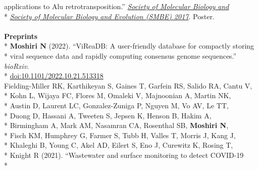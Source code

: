 \documentclass[margin,line]{res}
\begin{document}
\begin{resume}
\hspace*{9mm} applications to Alu retrotransposition.'' \href{https://smbe.org/smbe/}{\textit{Society of Molecular Biology and}}\\*\vspace{2mm}
\hspace*{8mm} \href{https://smbe.org/smbe/}{\textit{Society of Molecular Biology and Evolution (SMBE) 2017}}. Poster.\\
~\\
\textbf{Preprints}\vspace{2mm}\\*
\hspace*{4mm} \textbf{Moshiri N} (2022). ``ViReaDB: A user-friendly database for compactly storing\\*
\hspace*{9mm} viral sequence data and rapidly computing consensus genome sequences.'' \textit{bioRxiv}.\\*\vspace{2mm}
\hspace*{8mm} \href{https://doi.org/10.1101/2022.10.21.513318}{doi:10.1101/2022.10.21.513318}\\
\hspace*{4mm} Fielding-Miller RK, Karthikeyan S, Gaines T, Garfein RS, Salido RA, Cantu V,\\*
\hspace*{10mm} Kohn L, Wijaya FC, Flores M, Omaleki V, Majnoonian A, Martin NK,\\*\vspace{2mm}
\hspace*{9mm} Austin D, Laurent LC, Gonzalez-Zuniga P, Nguyen M, Vo AV, Le TT,\\*
\hspace*{9mm} Duong D, Hassani A, Tweeten S, Jepsen K, Henson B, Hakim A,\\*
\hspace*{9mm} Birmingham A, Mark AM, Nasamran CA, Rosenthal SB, \textbf{Moshiri N},\\*
\hspace*{9mm} Fisch KM, Humphrey G, Farmer S, Tubb H, Valles T, Morris J, Kang J,\\*
\hspace*{9mm} Khaleghi B, Young C, Akel AD, Eilert S, Eno J, Curewitz K, Rosing T,\\*
\hspace*{9mm} Knight R (2021). ``Wastewater and surface monitoring to detect COVID-19\\*

\end{resume}
\end{document}
